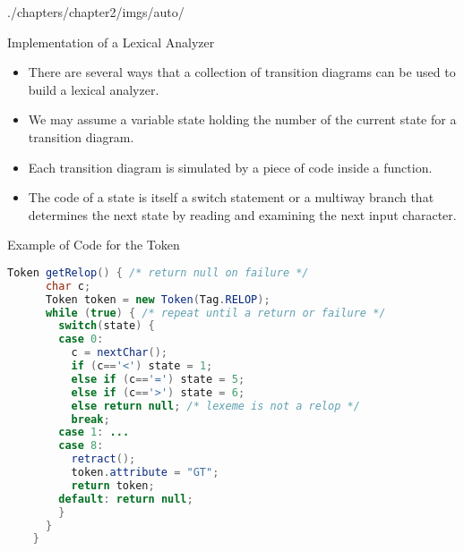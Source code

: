 \begin{graphicspathcontext}{{./chapters/chapter2/imgs/auto/}}
\begin{bibunit}[apalike]
\tableofcontentslide[sections={2-5},sectionstyle={show/shaded},subsectionstyle={show/shaded/hide},subsubsectionstyle={show/shaded/hide/hide}]

\begin{frame}{Implementation of a Lexical Analyzer}
	\begin{itemize}
	\item There are several ways that a collection of transition diagrams can be used to build a lexical analyzer.
	\vfill
	\item We may assume a variable state holding the number of the current state for a transition diagram.
	\vfill
	\item Each transition diagram is simulated by a piece of code inside a function.
	\vfill
	\item The code of a state is itself a switch statement or a multiway branch that determines the next state by reading and examining the next input character.
	\end{itemize}
\end{frame}

\begin{frame}[fragile]{Example of Code for the Token }
	\begin{lstlisting}[language=Java]
	Token getRelop() { /* return null on failure */
	  char c;
	  Token token = new Token(Tag.RELOP);
	  while (true) { /* repeat until a return or failure */
	    switch(state) {
	    case 0: 
	      c = nextChar();
	      if (c=='<') state = 1;
	      else if (c=='=') state = 5;
	      else if (c=='>') state = 6;
	      else return null; /* lexeme is not a relop */
	      break;
	    case 1: ...
	    case 8:
	      retract();
	      token.attribute = "GT";
	      return token;
	    default: return null;
	    }
	  }
	}
	\end{lstlisting}
\end{frame}


\end{bibunit}
\end{graphicspathcontext}
